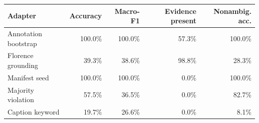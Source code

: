 \begin{tabular}{lrrrr}
\toprule
Adapter & Accuracy & Macro-F1 & Evidence present & Nonambig. acc. \\
\midrule
Annotation bootstrap & 100.0\% & 100.0\% & 57.3\% & 100.0\% \\
Florence grounding & 39.3\% & 38.6\% & 98.8\% & 28.3\% \\
Manifest seed & 100.0\% & 100.0\% & 0.0\% & 100.0\% \\
Majority violation & 57.5\% & 36.5\% & 0.0\% & 82.7\% \\
Caption keyword & 19.7\% & 26.6\% & 0.0\% & 8.1\% \\
\bottomrule
\end{tabular}
